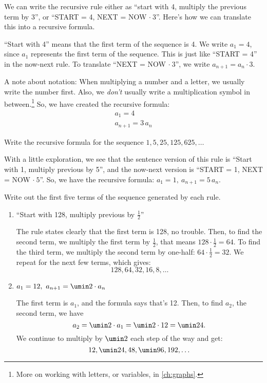 We can write the recursive rule either as ``start with 4, multiply the previous term by 3'', or ``START = 4, NEXT = NOW $\cdot~3$''. Here's how we can translate this into a recursive formula.

``Start with 4'' means that the first term of the sequence is 4. We write $a_1 = 4$, since $a_1$ represents the first term of the sequence. This is just like ``START = 4'' in the now-next rule. To translate ``NEXT = NOW $\cdot~3$'', we write $a_{n+1} = a_n \cdot 3$.

A note about notation: When multiplying a number and a letter, we usually write the number first. Also, we \textit{don't} usually write a multiplication symbol in between.\footnote{More on working with letters, or variables, in \cref{ch:graphs}.} So, we have created the recursive formula: \[\begin{array}{c}a_1=4 \\ a_{n+1}=3\,a_n\end{array}\]

\begin{boxedex}
Write the recursive formula for the sequence $1, 5, 25, 125, 625, \dotsc$

\exsoln{} With a little exploration, we see that the sentence version of this rule is ``Start with 1, multiply previous by 5'', and the now-next version is ``START = 1, NEXT = NOW $\cdot~5$''. So, we have the recursive formula: $a_1 = 1, ~ a_{n+1} = 5 \, a_n$.
\end{boxedex}
 
\begin{boxedex}
Write out the first five terms of the sequence generated by each rule.

\begin{enumerate}
\item ``Start with 128, multiply previous by $\frac{1}{2}$''

\exsoln{} The rule states clearly that the first term is 128, no trouble. Then, to find the second term, we multiply the first term by $\frac{1}{2}$, that means $128 \cdot \frac{1}{2} = 64$. To find the third term, we multiply the second term by one-half: $64 \cdot \frac{1}{2} = 32$. We repeat for the next few terms, which gives:\[128, 64, 32, 16, 8, \dotsc\]

\item $a_1 = 12, ~ a_{n+1} = \umin2 \cdot a_n$

\exsoln{} The first term is $a_1$, and the formula says that's 12. Then, to find $a_2$, the second term, we have \[a_2 = \umin2 \cdot a_1 = \umin2 \cdot 12 = \umin24.\] We continue to multiply by $\umin2$ each step of the way and get:\[12, \umin24, 48, \umin96, 192, \dotsc\]
\end{enumerate}
\end{boxedex}

